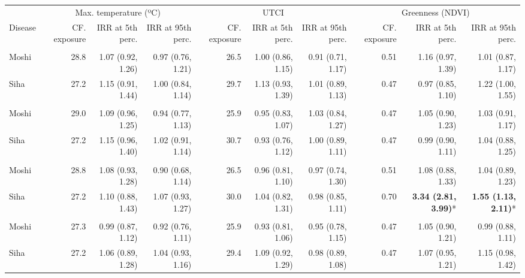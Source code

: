 \begin{table}[t]
\fontsize{12.0pt}{14.4pt}\selectfont
\begin{tabular*}{\linewidth}{@{\extracolsep{\fill}}l|rrrrrrrrr}
\toprule
 & \multicolumn{3}{c}{Max. temperature (ºC)} & \multicolumn{3}{c}{UTCI} & \multicolumn{3}{c}{Greenness (NDVI)} \\ 
\cmidrule(lr){2-4} \cmidrule(lr){5-7} \cmidrule(lr){8-10}
Disease & CF. exposure & IRR at 5th perc. & IRR at 95th perc. & CF. exposure & IRR at 5th perc. & IRR at 95th perc. & CF. exposure & IRR at 5th perc. & IRR at 95th perc. \\ 
\midrule\addlinespace[2.5pt]
\multicolumn{10}{l}{Chronic Respiratory Disease} \\[2.5pt] 
\midrule\addlinespace[2.5pt]
Moshi & 28.8 & 1.07 (0.92, 1.26) & 0.97 (0.76, 1.21) & 26.5 & 1.00 (0.86, 1.15) & 0.91 (0.71, 1.17) & 0.51 & 1.16 (0.97, 1.39) & 1.01 (0.87, 1.17) \\ 
Siha & 27.2 & 1.15 (0.91, 1.44) & 1.00 (0.84, 1.14) & 29.7 & 1.13 (0.93, 1.39) & 1.01 (0.89, 1.13) & 0.47 & 0.97 (0.85, 1.10) & 1.22 (1.00, 1.55) \\ 
\midrule\addlinespace[2.5pt]
\multicolumn{10}{l}{Hypertension} \\[2.5pt] 
\midrule\addlinespace[2.5pt]
Moshi & 29.0 & 1.09 (0.96, 1.25) & 0.94 (0.77, 1.13) & 25.9 & 0.95 (0.83, 1.07) & 1.03 (0.84, 1.27) & 0.47 & 1.05 (0.90, 1.23) & 1.03 (0.91, 1.17) \\ 
Siha & 27.2 & 1.15 (0.96, 1.40) & 1.02 (0.91, 1.14) & 30.7 & 0.93 (0.76, 1.12) & 1.00 (0.89, 1.11) & 0.47 & 0.99 (0.90, 1.11) & 1.04 (0.88, 1.25) \\ 
\midrule\addlinespace[2.5pt]
\multicolumn{10}{l}{Diabetes Mellitus} \\[2.5pt] 
\midrule\addlinespace[2.5pt]
Moshi & 28.8 & 1.08 (0.93, 1.28) & 0.90 (0.68, 1.14) & 26.5 & 0.96 (0.81, 1.10) & 0.97 (0.74, 1.30) & 0.51 & 1.08 (0.88, 1.33) & 1.04 (0.89, 1.23) \\ 
Siha & 27.2 & 1.10 (0.88, 1.43) & 1.07 (0.93, 1.27) & 30.0 & 1.04 (0.82, 1.31) & 0.98 (0.85, 1.11) & 0.70 & \textbf{3.34 (2.81, 3.99)}* & \textbf{1.55 (1.13, 2.11)}* \\ 
\midrule\addlinespace[2.5pt]
\multicolumn{10}{l}{Upper Respiratory Infections} \\[2.5pt] 
\midrule\addlinespace[2.5pt]
Moshi & 27.3 & 0.99 (0.87, 1.12) & 0.92 (0.76, 1.11) & 25.9 & 0.93 (0.81, 1.06) & 0.95 (0.78, 1.15) & 0.47 & 1.05 (0.90, 1.21) & 0.99 (0.88, 1.11) \\ 
Siha & 27.2 & 1.06 (0.89, 1.28) & 1.04 (0.93, 1.16) & 29.4 & 1.09 (0.92, 1.29) & 0.98 (0.89, 1.08) & 0.47 & 1.07 (0.95, 1.21) & 1.15 (0.98, 1.42) \\ 

\end{tabular*}
\end{table}
